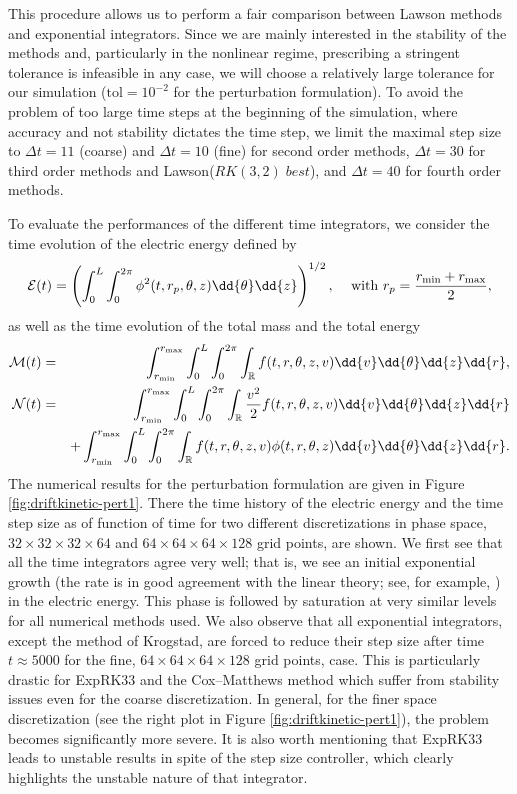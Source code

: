 This procedure allows us to perform a fair comparison between Lawson methods and exponential integrators. Since we are mainly interested in the stability of the methods and, particularly in the nonlinear regime, prescribing a stringent tolerance is infeasible in any case, we will choose a relatively large tolerance for our simulation ($\text{tol}=10^{-2}$ for the perturbation formulation). To avoid the problem of too large time steps at the beginning of the simulation, where accuracy and not stability dictates the time step, we limit the maximal step size to $\Delta t=11$ (coarse) and $\Delta t=10$ (fine) for second order methods, $\Delta t=30$ for third order methods and Lawson($RK(3, 2) \; best$), and $\Delta t=40$ for fourth order methods.

To evaluate the performances of the different time integrators, we consider the time evolution of the electric energy defined by
$$
  {\cal E}(t) = \left( \int_{0}^{L} \int_0^{2\pi} \phi^2(t, r_p, \theta, z ) \dd{\theta} \dd{z} \right)^{1/2}, \;\;\; \mbox{ with } r_p=\frac{r_{\min}+r_{\max}}{2}, 
$$
as well as the time evolution of the total mass and the total energy 
\begin{eqnarray*}
  {\cal M}(t) &=& \int_{r_{\min}}^{r_{\max}} \int_{0}^{L} \int_0^{2\pi} \int_{\mathbb R} f(t, r, \theta, z, v ) \dd{v} \dd{\theta} \dd{z} \dd{r}, \nonumber\\ 
  {\cal N}(t) &=&\int_{r_{\min}}^{r_{\max}} \int_{0}^{L} \int_0^{2\pi} \int_{\mathbb R} \frac{v^2}{2} f(t, r, \theta, z, v ) \dd{v} \dd{\theta} \dd{z} \dd{r} \nonumber\\ 
  && + \int_{r_{\min}}^{r_{\max}} \int_{0}^{L} \int_0^{2\pi} \int_{\mathbb R} f(t, r, \theta, z, v )\phi(t, r, \theta, z) \dd{v} \dd{\theta} \dd{z} \dd{r}. 
\end{eqnarray*}
The numerical results for the perturbation formulation are given in Figure \ref{fig:driftkinetic-pert1}. There the time history of the electric energy and the time step size as of function of time for two different discretizations in phase space, $32 \times 32 \times 32 \times 64$ and  $64 \times 64 \times 64 \times 128$ grid points, are shown. We first see that all the time integrators agree very well; that is, we see an initial exponential growth (the rate is in good agreement with the linear theory; see, for example, \cite{Coulette:2013}) in the electric energy. This phase is followed by saturation at very similar levels for all numerical methods used. We also observe that all exponential integrators, except the method of Krogstad, are forced to reduce their step size after time $t\approx 5000$ for the fine, \ie $64\times 64 \times 64 \times 128$ grid points, case. This is particularly drastic for ExpRK33 and the Cox--Matthews method which suffer from stability issues even for the coarse discretization. In general, for the finer space discretization (see the right plot in Figure \ref{fig:driftkinetic-pert1}), the problem becomes significantly more severe. It is also worth mentioning that ExpRK33 leads to unstable results in spite of the step size controller, which clearly highlights the unstable nature of that integrator. 
